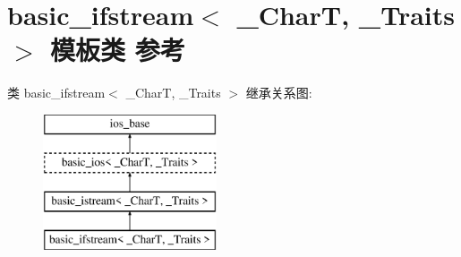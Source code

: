 \hypertarget{classbasic__ifstream}{}\section{basic\+\_\+ifstream$<$ \+\_\+\+CharT, \+\_\+\+Traits $>$ 模板类 参考}
\label{classbasic__ifstream}
类 basic\+\_\+ifstream$<$ \+\_\+\+CharT, \+\_\+\+Traits $>$ 继承关系图\+:\begin{figure}[H]
\begin{center}
\leavevmode
\includegraphics[height=4.000000cm]{classbasic__ifstream}
\end{center}
\end{figure}
